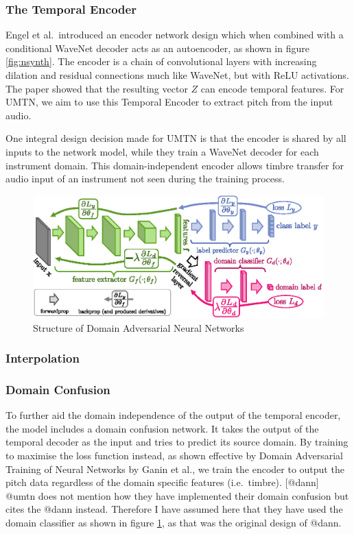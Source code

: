 \documentclass[]{report}
\begin{document}
\hypertarget{the-temporal-encoder}{%
\subsubsection{The Temporal Encoder}\label{the-temporal-encoder}}

Engel et al.~introduced an encoder network design which when combined
with a conditional WaveNet decoder acts as an autoencoder, as shown in
figure \ref{fig:nsynth}. The encoder is a chain of convolutional layers
with increasing dilation and residual connections much like WaveNet, but
with ReLU activations. The paper showed that the resulting vector \(Z\)
can encode temporal features. For UMTN, we aim to use this Temporal
Encoder to extract pitch from the input audio.

One integral design decision made for UMTN is that the encoder is shared
by all inputs to the network model, while they train a WaveNet decoder
for each instrument domain. This domain-independent encoder allows
timbre transfer for audio input of an instrument not seen during the
training process.

\begin{figure}[h]
    \includegraphics[width=\textwidth]{figures/dann.eps}
    \centering
    \caption{Structure of Domain Adversarial Neural Networks \label{fig:dann}}
\end{figure}

\hypertarget{interpolation}{%
\subsubsection{Interpolation}\label{interpolation}}

\hypertarget{domain-confusion}{%
\subsubsection{Domain Confusion}\label{domain-confusion}}

To further aid the domain independence of the output of the temporal
encoder, the model includes a domain confusion network. It takes the
output of the temporal decoder as the input and tries to predict its
source domain. By training to maximise the loss function instead, as
shown effective by Domain Adversarial Training of Neural Networks by
Ganin et al., we train the encoder to output the pitch data regardless
of the domain specific features (i.e.~timbre). {[}@dann{]} @umtn does
not mention how they have implemented their domain confusion but cites
the @dann instead. Therefore I have assumed here that they have used the
domain classifier as shown in figure \ref{fig:dann}, as that was the
original design of @dann.
\end{document}
